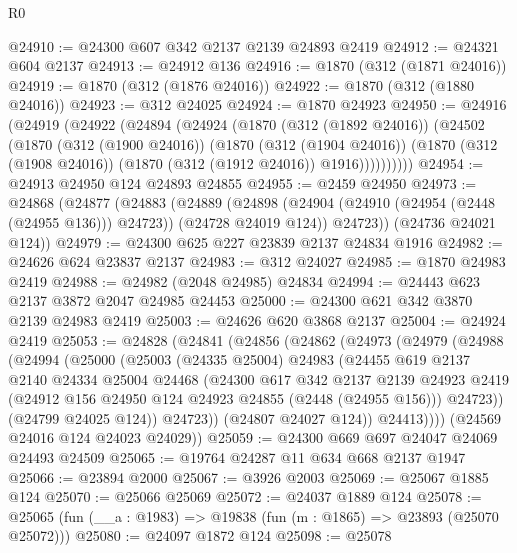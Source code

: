 \begin{lexlean}{R0}
\begin{coremodule}
@24910 := @24300 @607 @342 @2137 @2139 @24893 @2419
@24912 := @24321 @604 @2137
@24913 := @24912 @136
@24916 := @1870 (@312 (@1871 @24016))
@24919 := @1870 (@312 (@1876 @24016))
@24922 := @1870 (@312 (@1880 @24016))
@24923 := @312 @24025
@24924 := @1870 @24923
@24950 := @24916
    (@24919
      (@24922
        (@24894
          (@24924
            (@1870
              (@312 (@1892 @24016))
              (@24502
                (@1870
                  (@312 (@1900 @24016))
                  (@1870
                    (@312 (@1904 @24016))
                    (@1870 (@312 (@1908 @24016)) (@1870 (@312 (@1912 @24016)) @1916))))))))))
@24954 := @24913 @24950 @124 @24893 @24855
@24955 := @2459 @24950
@24973 := @24868
    (@24877
      (@24883
        (@24889
          (@24898 (@24904 (@24910 (@24954 (@2448 (@24955 @136))) @24723)) (@24728 @24019 @124))
          @24723))
      (@24736 @24021 @124))
@24979 := @24300 @625 @227 @23839 @2137 @24834 @1916
@24982 := @24626 @624 @23837 @2137
@24983 := @312 @24027
@24985 := @1870 @24983 @2419
@24988 := @24982 (@2048 @24985) @24834
@24994 := @24443 @623 @2137 @3872 @2047 @24985 @24453
@25000 := @24300 @621 @342 @3870 @2139 @24983 @2419
@25003 := @24626 @620 @3868 @2137
@25004 := @24924 @2419
@25053 := @24828
    (@24841
      (@24856
        (@24862
          (@24973
            (@24979
              (@24988
                (@24994
                  (@25000
                    (@25003
                      (@24335 @25004)
                      @24983
                      (@24455
                        @619
                        @2137
                        @2140
                        @24334
                        @25004
                        @24468
                        (@24300
                          @617
                          @342
                          @2137
                          @2139
                          @24923
                          @2419
                          (@24912 @156 @24950 @124 @24923 @24855 (@2448 (@24955 @156)))
                          @24723))
                      (@24799 @24025 @124))
                    @24723))
                (@24807 @24027 @124))
              @24413))))
      (@24569 @24016 @124 @24023 @24029))
@25059 := @24300 @669 @697 @24047 @24069 @24493 @24509
@25065 := @19764 @24287 @11 @634 @668 @2137 @1947
@25066 := @23894 @2000
@25067 := @3926 @2003
@25069 := @25067 @1885 @124
@25070 := @25066 @25069
@25072 := @24037 @1889 @124
@25078 := @25065 (fun (__a : @1983) => @19838 (fun (m : @1865) => @23893 (@25070 @25072)))
@25080 := @24097 @1872 @124
@25098 := @25078

\end{coremodule}
\end{lexlean}
